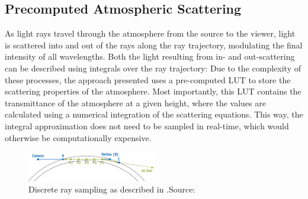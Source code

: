 \documentclass[12pt]{article}
\begin{document}
\subsection{Precomputed Atmospheric Scattering}
As light rays travel through the atmosphere from the source to the viewer, light is scattered into and out of the rays along the ray trajectory, modulating the final intensity of all wavelengths.
Both the light resulting from in- and out-scattering can be described using integrals over the ray trajectory:
Due to the complexity of these processes, the approach presented \cite{bruneton_precomputed_2008} uses a pre-computed LUT to store the scattering properties of the atmosphere.
Most importantly, this LUT contains the transmittance of the atmosphere at a given height, where the values are calculated using a numerical integration of the scattering equations.
This way, the integral approximation does not need to be sampled in real-time, which would otherwise be computationally expensive.
\begin{figure}[h!]
    \centering
    \includegraphics[width=0.5\textwidth]{./figures/ray_oneill.jpg}
    \caption{Discrete ray sampling as described in \cite{oneil_chapter_nodate}.Source: \cite{oneil_chapter_nodate}}
    \label{fig:oneill_scattering}
\end{figure}
\end{document}
